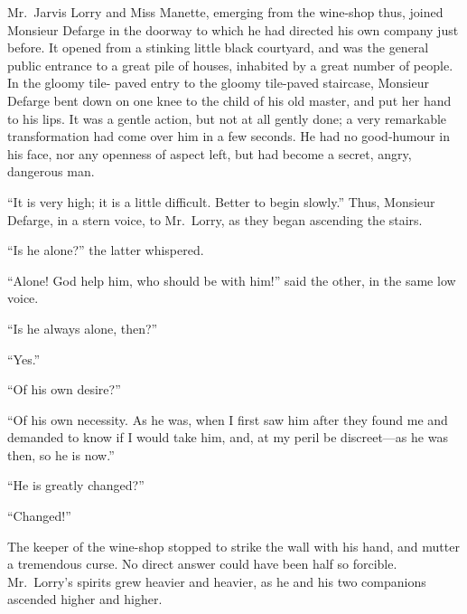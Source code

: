 Mr.\ Jarvis Lorry and Miss Manette, emerging from the wine-shop thus,
joined Monsieur Defarge in the doorway to which he had directed his
own company just before.  It opened from a stinking little black
courtyard, and was the general public entrance to a great pile of
houses, inhabited by a great number of people.  In the gloomy tile-%
paved entry to the gloomy tile-paved staircase, Monsieur Defarge bent
down on one knee to the child of his old master, and put her hand to
his lips.  It was a gentle action, but not at all gently done; a very
remarkable transformation had come over him in a few seconds.  He had
no good-humour in his face, nor any openness of aspect left, but had
become a secret, angry, dangerous man.

``It is very high; it is a little difficult.  Better to begin slowly.''
Thus, Monsieur Defarge, in a stern voice, to Mr.\ Lorry, as they began
ascending the stairs.

``Is he alone?'' the latter whispered.

``Alone!  God help him, who should be with him!'' said the other, in the
same low voice.

``Is he always alone, then?''

``Yes.''

``Of his own desire?''

``Of his own necessity.  As he was, when I first saw him after they
found me and demanded to know if I would take him, and, at my peril
be discreet---as he was then, so he is now.''

``He is greatly changed?''

``Changed!''

The keeper of the wine-shop stopped to strike the wall with his hand,
and mutter a tremendous curse.  No direct answer could have been half
so forcible.  Mr.\ Lorry's spirits grew heavier and heavier, as he and
his two companions ascended higher and higher.

